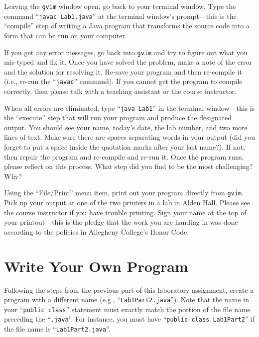 \documentclass[11pt]{article}
\begin{document}
Leaving the {\tt gvim} window open, go back to your terminal window. Type the command ``{\tt javac Lab1.java}'' at the
terminal window's prompt---this is the ``compile'' step of writing a Java program that transforms the source code into a
form that can be run on your computer.

If you get any error messages, go back into {\tt gvim} and try to figure out what you mis-typed and fix it. Once you
have solved the problem, make a note of the error and the solution for resolving it. Re-save your program and then
re-compile it (i.e., re-run the ``{\tt javac}'' command). If you cannot get the program to compile correctly, then
please talk with a teaching assistant or the course instructor.

When all errors are eliminated, type ``{\tt java Lab1}'' in the terminal window---this is the ``execute'' step that will
run your program and produce the designated output.  You should see your name, today's date, the lab number, and two
more lines of text. Make sure there are spaces separating words in your output (did you forget to put a space inside the
quotation marks after your last name?). If not, then repair the program and re-compile and re-run it.  Once the program
runs, please reflect on this process.  What step did you find to be the most challenging? Why?

Using the ``File/Print'' menu item, print out your program directly from {\tt gvim}. Pick up your output at one of the
two printers in a lab in Alden Hall.  Please see the course instructor if you have trouble printing.  Sign your name at
the top of your printout---this is the pledge that the work you are handing in was done according to the policies in
Allegheny College's Honor Code.

\vspace*{-.15in}
\section*{Write Your Own Program}
\vspace*{-.05in}

Following the steps from the previous part of this laboratory assignment, create a program with a different name (e.g.,
``{\tt Lab1Part2.java}''). Note that the name in your ``{\tt public class}'' statement must exactly match the portion of
the file name preceding the ``{\tt .java}''.  For instance, you must have ``{\tt public class Lab1Part2}'' if the file
name is ``{\tt Lab1Part2.java}''.
\end{document}
